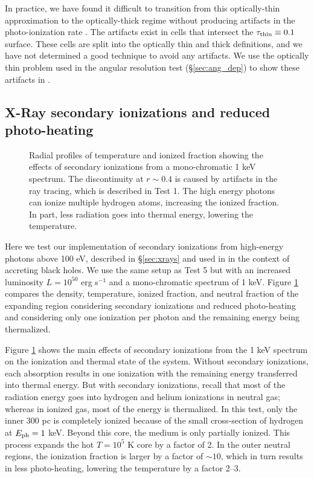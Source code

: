 \documentclass[12pt,preprint]{aastex}
\begin{document}
In practice, we have found it difficult to transition from this
optically-thin approximation to the optically-thick regime without
producing artifacts in the photo-ionization rate \kph.  The artifacts
exist in cells that intersect the $\tau_{\rm thin} \equiv 0.1$
surface.  These cells are split into the optically thin and thick
definitions, and we have not determined a good technique to avoid any
artifacts.  We use the optically thin problem used in the angular
resolution test (\S\ref{sec:ang_dep}) to show these artifacts in \kph.

\subsection{X-Ray secondary ionizations and reduced photo-heating}

\begin{figure}[t]
  \caption{\label{fig:xray_fig} Radial profiles of temperature and
    ionized fraction showing the effects of secondary ionizations from
    a mono-chromatic 1 keV spectrum.  The discontinuity at $r \sim
    0.4$ is caused by artifacts in the ray tracing, which is described
    in Test 1.  The high energy photons can ionize multiple hydrogen
    atoms, increasing the ionized fraction.  In part, less radiation
    goes into thermal energy, lowering the temperature.}
\end{figure}

Here we test our implementation of secondary ionizations from
high-energy photons above 100 eV, described in \S\ref{sec:xrays} and
used in \citet{Alvarez09} in the context of accreting black holes.  We
use the same setup as Test 5 but with an increased luminosity $L =
10^{50}$ erg s$^{-1}$ and a mono-chromatic spectrum of 1 keV.  Figure
\ref{fig:xray_fig} compares the density, temperature, ionized
fraction, and neutral fraction of the expanding  region
considering secondary ionizations and reduced photo-heating and
considering only one ionization per photon and the remaining energy
being thermalized.

Figure \ref{fig:xray_fig} shows the main effects of secondary
ionizations from the 1 keV spectrum on the ionization and thermal
state of the system.  Without secondary ionizations, each absorption
results in one ionization with the remaining energy transferred into
thermal energy.  But with secondary ionizations, recall that most of
the radiation energy goes into hydrogen and helium ionizations in
neutral gas; whereas in ionized gas, most of the energy is
thermalized.  In this test, only the inner 300 pc is completely
ionized because of the small cross-section of hydrogen at $E_{\rm ph}
= 1$ keV.  Beyond this core, the medium is only partially ionized.
This process expands the hot $T = 10^5$ K core by a factor of 2.  In
the outer neutral regions, the ionization fraction is larger by a
factor of $\sim 10$, which in turn results in less photo-heating,
lowering the temperature by a factor 2--3.
\end{document}
